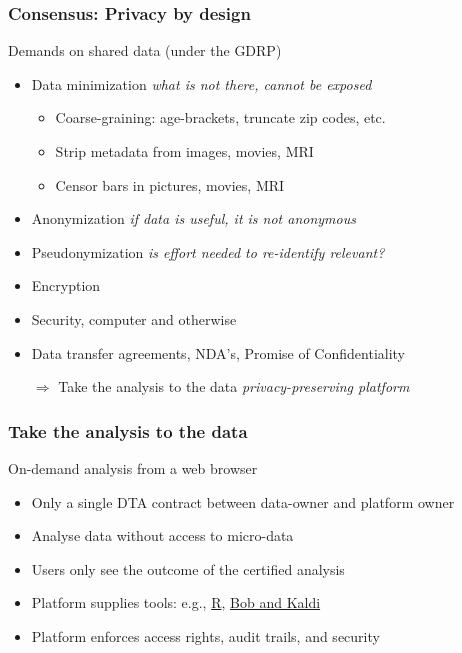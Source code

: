 \documentclass[xcolor=dvipsnames]{beamer}
\begin{document}
\begin{frame}
	\frametitle{Consensus: Privacy by design}
	
	\begin{block}{Demands on shared data (under the GDRP)}
	\begin{itemize}
	\item Data minimization {\hspace{2cm} \small \em what is not there, cannot be exposed}
	\begin{itemize}
	\item Coarse-graining: age-brackets, truncate zip codes, etc.
	\item Strip metadata from images, movies, MRI
	\item Censor bars in pictures, movies, MRI 
	\end{itemize}
	\item Anonymization {\hspace{2.6cm} \small \em if data is useful, it is not anonymous}
	\item Pseudonymization {\hspace{2cm} \small \em is effort needed to re-identify relevant?}
	\item Encryption
	\item Security, computer and otherwise
	\item Data transfer agreements, NDA's, Promise of Confidentiality
	\item[$\Rightarrow$] {\color{Maroon}Take the analysis to the data} {\hspace{2cm} \small \em privacy-preserving platform}
	\end{itemize}
	\end{block}	

\end{frame}

\begin{frame}
	\frametitle{Take the analysis to the data}
	
	\begin{block}{On-demand analysis from a web browser}
	\begin{itemize}
	\item Only a single DTA contract between data-owner and platform owner
	\item Analyse data without access to micro-data
	\item Users only see the outcome of the certified analysis
	\item Platform supplies tools: e.g., \href{https://www.ncbi.nlm.nih.gov/pmc/articles/PMC4276062/}{\color{blue} R}, \href{http://publications.idiap.ch/downloads/papers/2017/Cernak_INTERSPEECH_2017.pdf}{\color{blue} Bob and Kaldi} {\scriptsize\cite{cernak2017bob,DataSHIELD2014:short}}
	\item Platform enforces access rights, audit trails, and security
	\end{itemize}
	\end{block}	
\end{frame}
\end{document}
